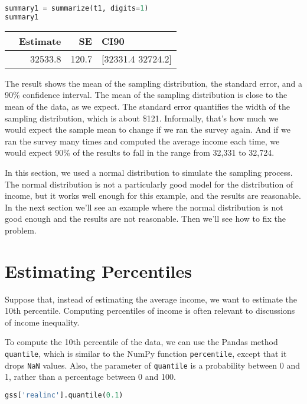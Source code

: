 \begin{lstlisting}[language=Python,style=source]
summary1 = summarize(t1, digits=1)
summary1
\end{lstlisting}

\begin{tabular}{lrrl}
\toprule
 & Estimate & SE & CI90 \\
\midrule
 & 32533.8 & 120.7 & [32331.4 32724.2] \\
\bottomrule
\end{tabular}

The result shows the mean of the sampling distribution, the standard
error, and a 90\% confidence interval. The mean of the sampling
distribution is close to the mean of the data, as we expect. The
standard error quantifies the width of the sampling distribution, which
is about \$121. Informally, that's how much we would expect the sample
mean to change if we ran the survey again. And if we ran the survey many
times and computed the average income each time, we would expect 90\% of
the results to fall in the range from 32,331 to 32,724.

In this section, we used a normal distribution to simulate the sampling
process. The normal distribution is not a particularly good model for
the distribution of income, but it works well enough for this example,
and the results are reasonable. In the next section we'll see an example
where the normal distribution is not good enough and the results are not
reasonable. Then we'll see how to fix the problem.

\section{Estimating Percentiles}\label{estimating-percentiles}

Suppose that, instead of estimating the average income, we want to
estimate the 10th percentile. Computing percentiles of income is often
relevant to discussions of income inequality.

To compute the 10th percentile of the data, we can use the Pandas method
\passthrough{\lstinline!quantile!}, which is similar to the NumPy
function \passthrough{\lstinline!percentile!}, except that it drops
\passthrough{\lstinline!NaN!} values. Also, the parameter of
\passthrough{\lstinline!quantile!} is a probability between 0 and 1,
rather than a percentage between 0 and 100.

\begin{lstlisting}[language=Python,style=source]
gss['realinc'].quantile(0.1)
\end{lstlisting}

